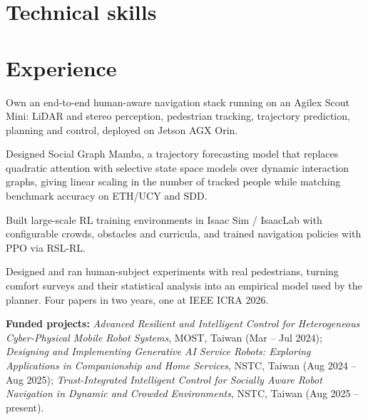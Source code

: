 \documentclass[10pt]{article}
\begin{document}

\section{Technical skills}


\section{Experience}

\begin{achievements}
  \item Own an end-to-end human-aware navigation stack running on an Agilex
        Scout Mini: LiDAR and stereo perception, pedestrian tracking, trajectory
        prediction, planning and control, deployed on Jetson AGX Orin.
  \item Designed Social Graph Mamba, a trajectory forecasting model that replaces
        quadratic attention with selective state space models over dynamic
        interaction graphs, giving linear scaling in the number of tracked people
        while matching benchmark accuracy on ETH/UCY and SDD.
  \item Built large-scale RL training environments in Isaac Sim / IsaacLab with
        configurable crowds, obstacles and curricula, and trained navigation
        policies with PPO via RSL-RL.
  \item Designed and ran human-subject experiments with real pedestrians,
        turning comfort surveys and their statistical analysis into an empirical
        model used by the planner. Four papers in two years, one at IEEE ICRA 2026.
\end{achievements}
\begin{detail}
{\fontsize{9}{11.5}\selectfont\textbf{Funded projects:} \emph{Advanced Resilient and
Intelligent Control for Heterogeneous Cyber-Physical Mobile Robot Systems}, MOST,
Taiwan (Mar -- Jul 2024); \emph{Designing and Implementing Generative AI Service
Robots: Exploring Applications in Companionship and Home Services}, NSTC, Taiwan
(Aug 2024 -- Aug 2025); \emph{Trust-Integrated Intelligent Control for Socially
Aware Robot Navigation in Dynamic and Crowded Environments}, NSTC, Taiwan
(Aug 2025 -- present).}
\end{detail}
\end{document}
